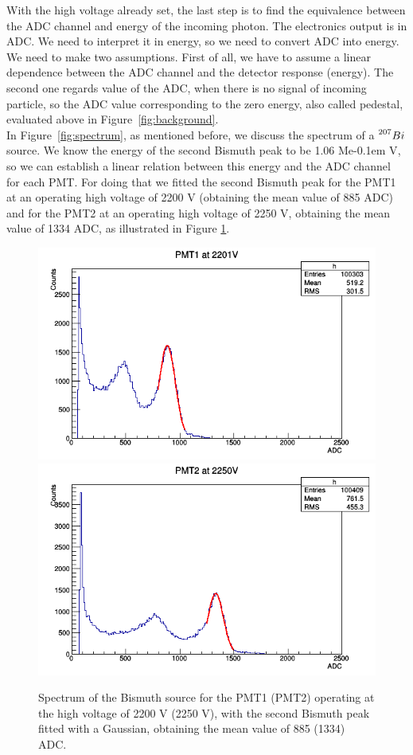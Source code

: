 \documentclass[10pt,swedish, openany]{book}
\def\MeV{\ifmmode {\mathrm{\ Me\kern -0.1em V}}\else
                   \textrm{Me\kern -0.1em V}\fi}%
\begin{document}
With the high voltage already set, the last step is to find the equivalence between the ADC channel and energy of the incoming photon. The electronics output is in ADC. We need to interpret it in energy, so we need to convert ADC into energy. We need to make two assumptions. First of all, we have to assume a linear dependence between the ADC channel and the detector response (energy). The second one regards value of the ADC, when there is no signal of incoming particle, so the ADC value corresponding to the zero energy, also called pedestal, evaluated above in Figure~\ref{fig:background}.\\

In Figure~\ref{fig:spectrum}, as mentioned before, we discuss the spectrum of a $\prescript{207}{}{Bi}$ source. We know the energy of the second Bismuth peak to be 1.06 \MeV, so we can establish a linear relation between this energy and the ADC channel for each PMT. For doing that we fitted the second Bismuth peak for the PMT1 at an operating high voltage of 2200 V (obtaining the mean value of 885 ADC) and for the PMT2 at an operating high voltage of 2250 V, obtaining the mean value of 1334 ADC, as illustrated in Figure \ref{fig:pmt_fits}.

\begin{figure}[H]
\includegraphics[scale=0.39]{PMT1_2201V.png}
\includegraphics[scale=0.39]{PMT2_2250V.png}
\centering
\caption{Spectrum of the Bismuth source for the PMT1 (PMT2) operating at the high voltage of  2200 V (2250 V), with the second Bismuth peak fitted with a Gaussian, obtaining the mean value of 885 (1334) ADC.}
\label{fig:pmt_fits}
\end{figure}
\end{document}
